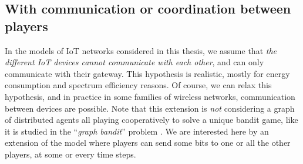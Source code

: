 




\subsection{With communication or coordination between players}
\label{sub:5:withCommunicationOrCoordination}

In the models of IoT networks considered in this thesis, we assume that \emph{the different IoT devices cannot communicate with each other}, and can only communicate with their gateway.
This hypothesis is realistic, mostly for energy consumption and spectrum efficiency reasons.
Of course, we can relax this hypothesis, and in practice in some families of wireless networks, communication between devices are possible.
Note that this extension is \emph{not} considering a graph of distributed agents all playing cooperatively to solve a unique bandit game, like it is studied in the ``\emph{graph bandit}'' problem \cite{valko2016bandits}.
We are interested here by an extension of the model where players can send some bits to one or all the other players, at some or every time steps.

